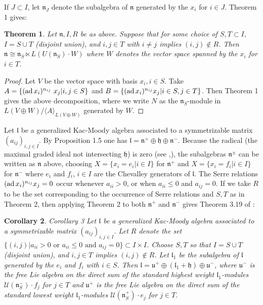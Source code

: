 \documentclass[11pt]{amsart}
\newtheorem{theorem}{Theorem}%
\newtheorem{corollary}[theorem]{Corollary}
\theoremstyle{definition}
\newcommand \ad{\text{ad}\thinspace}
\renewcommand{\frak}{\mathfrak}
\begin{document}
If $J\subset I$, let $\frak n_J$
denote the subalgebra of $\frak n$ generated by the $x_i$ for $i \in
J$. 
Theorem 1 gives:

\begin{theorem} Let $\frak n, I, R$ be as above. 
Suppose that for some choice of $S,T \subset I$, $I = S\cup T$
(disjoint union),  and $i,j \in T$ with $i \neq j$
implies $(i,j) \notin R$. 
Then $\frak n \cong \frak n_S \ltimes L(U(\frak n_S)\cdot W)$
where $W$ denotes the vector space spanned by the $x_i$ for $i \in T$.
\end{theorem}

\begin{proof}
Let $V$ be the vector space with basis $x_i , i \in S$. Take 
$A = \{ (\ad x_i)^{n_{ij}}~x_j | i, j \in S\}$ and 
$B = \{ (\ad x_i)^{n_{ij}}x_j | i \in S, j \in T\}$. Then Theorem 1 
gives the above decomposition, where we write $N$ as the $\frak n_S$-module in
$L(V \oplus W)/\langle A \rangle_{L(V \oplus W)}$ generated by $W$.
\end{proof}

Let $\frak l$ be a generalized Kac-Moody algebra associated to a symmetrizable 
matrix $(a_{ij})_{i,j\in I}$.
By Proposition 1.5 \cite{6} one has
$\frak l = \frak n^+ \oplus \frak h \oplus \frak n^-$.
Because the radical (the maximal graded ideal not intersecting 
$\frak h$) is zero (see \cite{6},\cite{7}), the subalgebras  
$\frak n^\pm$ can be
written as $\frak n$ above, choosing $X= \{x_i = e_i | i \in I\}$ 
for $\frak n^+$ and $X= \{x_i = f_i | i \in I\}$ for $\frak n^-$ where 
$e_i$ and $f_i$, $i \in I$ are the Chevalley generators of $\frak
l$. The Serre relations 
$(\ad x_i)^{n_{ij}}x_j=0$ occur whenever $a_{ii}>0$, or when 
$a_{ii}\leq 0$ and $a_{ij} =0$.
If we take $R$ to be the set corresponding to the occurrence of Serre
relations and $S, T$ as in Theorem 2, then applying Theorem 2 to both
$\frak n^+$ and $\frak n^-$ gives Theorem 3.19 of \cite{7}:

\begin{corollary}{Corollary 3}
Let $\frak l$ be a generalized Kac-Moody algebra associated to a symmetrizable 
matrix $(a_{ij})_{i,j\in I}$. Let $R$ denote the
set $\{(i,j)| a_{ii}>0 \text{ or } a_{ii}\leq 0 \text{ and } a_{ij} =0\}\subset
I \times I$. Choose $S,T$ so that
$I = S \cup T$ (disjoint union), and
$i,j \in T$ implies $(i,j) \notin R$.
Let $\frak l_{1}$ be the subalgebra of $\frak l$ 
generated by the $e_i$ and $f_i$ with $i \in S$. 
Then 
$\frak l = \frak u^+ \oplus (\frak l_{1}+ \frak h) \oplus \frak u^-$, 
where
$\frak u^-$ is the free Lie algebra 
on the direct sum of the standard highest weight
$\frak l_{1}$-modules
${\mathcal U}(\frak n^-_{S})\cdot f_j$ for $j \in T$ and 
$\frak u^+$ is the free Lie algebra on the direct sum of the
standard lowest weight $\frak l_{1}$-modules 
${\mathcal U}(\frak n^+_{S})\cdot e_j$ for $j \in T$.
\end{corollary}
\end{document}
